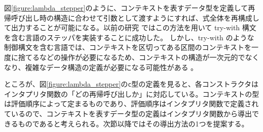 図\ref{figure:lambda_stepper}のように、コンテキストを表すデータ型を定義して再帰呼び出し時の構造に合わせて引数として渡すようにすれば、式全体を再構成して出力することが可能になる。以前の研究 \cite{FCA19} ではこの方法を用いて try-with 構文を含む言語のステッパを実装することに成功した。
しかし、try-with のような制御構文を含む言語では、コンテキストを区切ってある区間のコンテキストを一度に捨てるなどの操作が必要になるため、コンテキストの構造が一次元的でなくなり、複雑なデータ構造の定義が必要になる可能性がある \cite{FCA19} 。

ところが、図\ref{figure:lambda_stepper}の\texttt{c}型の定義を見ると、各コンストラクタはインタプリタ関数の「どの再帰呼び出しか」に対応している。コンテキストの型は評価順序によって定まるものであり、評価順序はインタプリタ関数で定義されているので、コンテキストを表すデータ型の定義はインタプリタ関数から導出できるものであると考えられる。次節以降ではその導出方法の1つを提案する。
